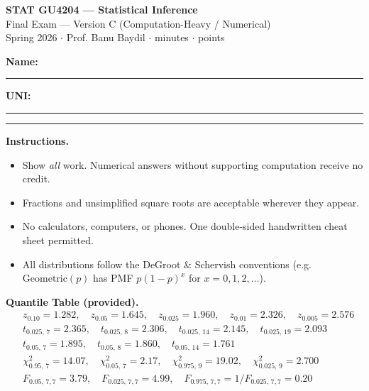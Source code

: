 \documentclass[11pt]{article}
\begin{document}
\begin{center}
    {\large\textbf{STAT GU4204 --- Statistical Inference}}\\[2pt]
    {\normalsize Final Exam --- Version C (Computation-Heavy / Numerical)}\\[2pt]
    {\small Spring 2026 \quad $\cdot$ \quad Prof. Banu Baydil \quad $\cdot$  minutes \quad $\cdot$  points}
\end{center}

\vspace{0.5em}

\textbf{Name:} \rule{6cm}{0.4pt} \hfill \textbf{UNI:} \rule{4cm}{0.4pt}

\vspace{0.5em}

\hrule
\vspace{0.5em}

\textbf{Instructions.}
\begin{itemize}[leftmargin=*, itemsep=0pt, topsep=0pt]
    \item Show \emph{all} work. Numerical answers without supporting computation receive no credit.
    \item Fractions and unsimplified square roots are acceptable wherever they appear.
    \item No calculators, computers, or phones. One double-sided handwritten cheat sheet permitted.
    \item All distributions follow the DeGroot \& Schervish conventions (e.g.\ $\text{Geometric}(p)$ has PMF $p(1-p)^x$ for $x = 0,1,2,\dots$).
\end{itemize}

\textbf{Quantile Table (provided).}
\begin{align*}
&z_{0.10} = 1.282, \quad z_{0.05} = 1.645, \quad z_{0.025} = 1.960, \quad z_{0.01} = 2.326, \quad z_{0.005} = 2.576 \\[2pt]
&t_{0.025,\,7} = 2.365, \quad t_{0.025,\,8} = 2.306, \quad t_{0.025,\,14} = 2.145, \quad t_{0.025,\,19} = 2.093 \\[2pt]
&t_{0.05,\,7} = 1.895, \quad t_{0.05,\,8} = 1.860, \quad t_{0.05,\,14} = 1.761 \\[2pt]
&\chi^2_{0.95,\,7} = 14.07, \quad \chi^2_{0.05,\,7} = 2.17, \quad \chi^2_{0.975,\,9} = 19.02, \quad \chi^2_{0.025,\,9} = 2.700 \\[2pt]
&F_{0.05,\,7,7} = 3.79, \quad F_{0.025,\,7,7} = 4.99, \quad F_{0.975,\,7,7} = 1/F_{0.025,\,7,7} = 0.20
\end{align*}
\end{document}
